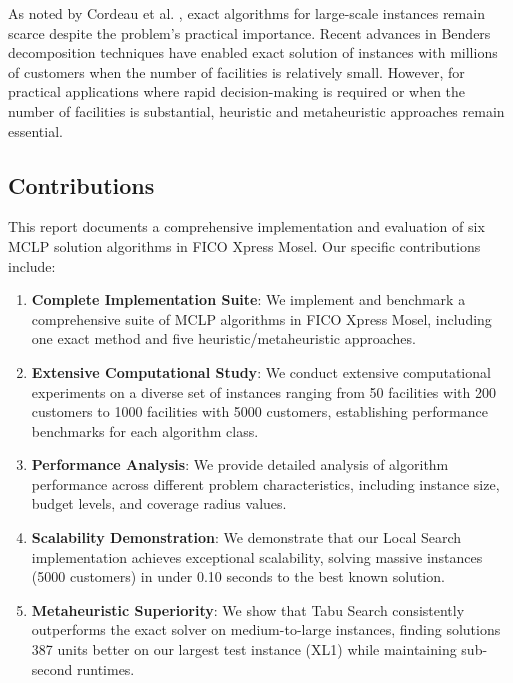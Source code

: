 \documentclass[11pt,a4paper]{article}
\begin{document}
As noted by Cordeau et al. \cite{cordeau2019}, exact algorithms for large-scale instances remain scarce despite the problem's practical importance. Recent advances in Benders decomposition techniques have enabled exact solution of instances with millions of customers when the number of facilities is relatively small. However, for practical applications where rapid decision-making is required or when the number of facilities is substantial, heuristic and metaheuristic approaches remain essential.

\subsection{Contributions}

This report documents a comprehensive implementation and evaluation of six MCLP solution algorithms in FICO Xpress Mosel. Our specific contributions include:

\begin{enumerate}
    \item \textbf{Complete Implementation Suite}: We implement and benchmark a comprehensive suite of MCLP algorithms in FICO Xpress Mosel, including one exact method and five heuristic/metaheuristic approaches.

    \item \textbf{Extensive Computational Study}: We conduct extensive computational experiments on a diverse set of instances ranging from 50 facilities with 200 customers to 1000 facilities with 5000 customers, establishing performance benchmarks for each algorithm class.

    \item \textbf{Performance Analysis}: We provide detailed analysis of algorithm performance across different problem characteristics, including instance size, budget levels, and coverage radius values.

    \item \textbf{Scalability Demonstration}: We demonstrate that our Local Search implementation achieves exceptional scalability, solving massive instances (5000 customers) in under 0.10 seconds to the best known solution.

    \item \textbf{Metaheuristic Superiority}: We show that Tabu Search consistently outperforms the exact solver on medium-to-large instances, finding solutions 387 units better on our largest test instance (XL1) while maintaining sub-second runtimes.
\end{enumerate}
\end{document}
